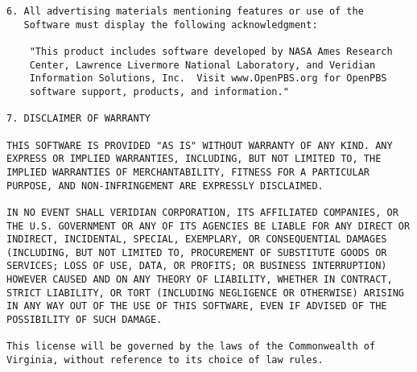 \begin{verbatim}
6. All advertising materials mentioning features or use of the
   Software must display the following acknowledgment:

    "This product includes software developed by NASA Ames Research
    Center, Lawrence Livermore National Laboratory, and Veridian
    Information Solutions, Inc.  Visit www.OpenPBS.org for OpenPBS
    software support, products, and information."

7. DISCLAIMER OF WARRANTY

THIS SOFTWARE IS PROVIDED "AS IS" WITHOUT WARRANTY OF ANY KIND. ANY
EXPRESS OR IMPLIED WARRANTIES, INCLUDING, BUT NOT LIMITED TO, THE
IMPLIED WARRANTIES OF MERCHANTABILITY, FITNESS FOR A PARTICULAR
PURPOSE, AND NON-INFRINGEMENT ARE EXPRESSLY DISCLAIMED.

IN NO EVENT SHALL VERIDIAN CORPORATION, ITS AFFILIATED COMPANIES, OR
THE U.S. GOVERNMENT OR ANY OF ITS AGENCIES BE LIABLE FOR ANY DIRECT OR
INDIRECT, INCIDENTAL, SPECIAL, EXEMPLARY, OR CONSEQUENTIAL DAMAGES
(INCLUDING, BUT NOT LIMITED TO, PROCUREMENT OF SUBSTITUTE GOODS OR
SERVICES; LOSS OF USE, DATA, OR PROFITS; OR BUSINESS INTERRUPTION)
HOWEVER CAUSED AND ON ANY THEORY OF LIABILITY, WHETHER IN CONTRACT,
STRICT LIABILITY, OR TORT (INCLUDING NEGLIGENCE OR OTHERWISE) ARISING
IN ANY WAY OUT OF THE USE OF THIS SOFTWARE, EVEN IF ADVISED OF THE
POSSIBILITY OF SUCH DAMAGE.

This license will be governed by the laws of the Commonwealth of
Virginia, without reference to its choice of law rules.
\end{verbatim}
